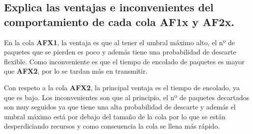 \subsection{Explica las ventajas e inconvenientes del comportamiento de cada cola AF1x y AF2x. }

En la cola \textbf{AFX1}, la ventaja es que al tener el umbral máximo alto, el nº de paquetes que se pierden es poco y además tiene una probabilidad
de descarte flexible. Como inconveniente es que el tiempo de encolado de paquetes es mayor que \textbf{AFX2}, por lo se tardan más en transmitir.

Con respeto a la cola \textbf{AFX2}, la principal ventaja es el tiempo de encolado, ya que es bajo. 
Los inconvenientes son que al principio, el nº de paquetes decartados son muy seguidos ya que tiene una alta probabilidad de descarte y además el
umbral máximo está por debajo del tamaño de la cola por lo que se están desperdiciando recursos y como conseuencia la cola se llena más rápido.
 

